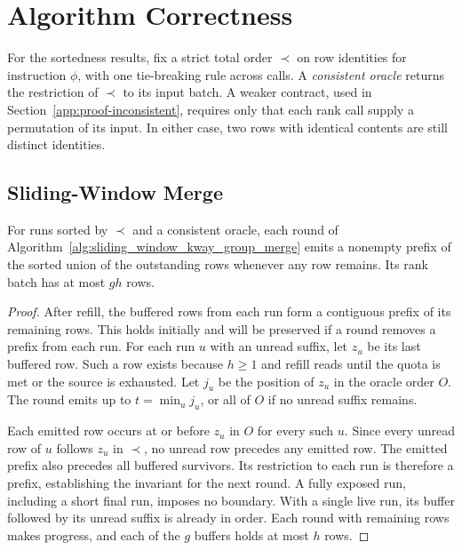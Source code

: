 \section{Algorithm Correctness}
\label{app:algorithm-proofs}

For the sortedness results, fix a strict total order $\prec$ on row identities for instruction $\phi$, with one tie-breaking rule across calls. A \emph{consistent oracle} returns the restriction of $\prec$ to its input batch. A weaker contract, used in Section~\ref{app:proof-inconsistent}, requires only that each rank call supply a permutation of its input. In either case, two rows with identical contents are still distinct identities.

\subsection{Sliding-Window Merge}
\label{app:proof-sw}

\begin{lemma}
For runs sorted by $\prec$ and a consistent oracle, each round of Algorithm~\ref{alg:sliding_window_kway_group_merge} emits a nonempty prefix of the sorted union of the outstanding rows whenever any row remains. Its rank batch has at most $gh$ rows.
\end{lemma}
\begin{proof}
After refill, the buffered rows from each run form a contiguous prefix of its remaining rows. This holds initially and will be preserved if a round removes a prefix from each run. For each run $u$ with an unread suffix, let $z_u$ be its last buffered row. Such a row exists because $h\ge1$ and refill reads until the quota is met or the source is exhausted. Let $j_u$ be the position of $z_u$ in the oracle order $O$. The round emits up to $t=\min_u j_u$, or all of $O$ if no unread suffix remains.

Each emitted row occurs at or before $z_u$ in $O$ for every such $u$. Since every unread row of $u$ follows $z_u$ in $\prec$, no unread row precedes any emitted row. The emitted prefix also precedes all buffered survivors. Its restriction to each run is therefore a prefix, establishing the invariant for the next round. A fully exposed run, including a short final run, imposes no boundary. With a single live run, its buffer followed by its unread suffix is already in order. Each round with remaining rows makes progress, and each of the $g$ buffers holds at most $h$ rows.
\end{proof}

